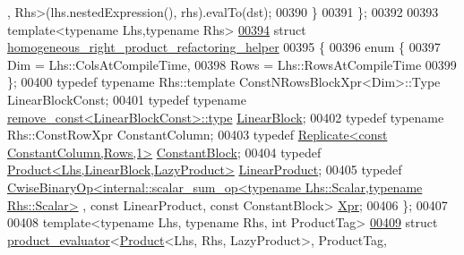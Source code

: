 \begin{DoxyCode}
      , Rhs>(lhs.nestedExpression(), rhs).evalTo(dst);
00390   \}
00391 \};
00392 
00393 \textcolor{keyword}{template}<\textcolor{keyword}{typename} Lhs,\textcolor{keyword}{typename} Rhs>
\hyperlink{struct_eigen_1_1internal_1_1homogeneous__right__product__refactoring__helper}{00394} \textcolor{keyword}{struct }\hyperlink{struct_eigen_1_1internal_1_1homogeneous__right__product__refactoring__helper}{homogeneous\_right\_product\_refactoring\_helper}
00395 \{
00396   \textcolor{keyword}{enum} \{
00397     Dim  = Lhs::ColsAtCompileTime,
00398     Rows = Lhs::RowsAtCompileTime
00399   \};
00400   \textcolor{keyword}{typedef} \textcolor{keyword}{typename} Rhs::template ConstNRowsBlockXpr<Dim>::Type          LinearBlockConst;
00401   \textcolor{keyword}{typedef} \textcolor{keyword}{typename} \hyperlink{group___sparse_core___module}{remove\_const<LinearBlockConst>::type}                
       \hyperlink{group___sparse_core___module}{LinearBlock};
00402   \textcolor{keyword}{typedef} \textcolor{keyword}{typename} Rhs::ConstRowXpr                                     ConstantColumn;
00403   \textcolor{keyword}{typedef} \hyperlink{group___core___module_class_eigen_1_1_replicate}{Replicate<const ConstantColumn,Rows,1>}                     
         \hyperlink{group___core___module_class_eigen_1_1_replicate}{ConstantBlock};
00404   \textcolor{keyword}{typedef} \hyperlink{group___core___module_class_eigen_1_1_product}{Product<Lhs,LinearBlock,LazyProduct>}                         
       \hyperlink{group___core___module_class_eigen_1_1_product}{LinearProduct};
00405   \textcolor{keyword}{typedef} 
      \hyperlink{group___core___module_class_eigen_1_1_cwise_binary_op}{CwiseBinaryOp<internal::scalar\_sum\_op<typename Lhs::Scalar,typename Rhs::Scalar>}
      , \textcolor{keyword}{const} LinearProduct, \textcolor{keyword}{const} ConstantBlock> \hyperlink{group___core___module_class_eigen_1_1_cwise_binary_op}{Xpr};
00406 \};
00407 
00408 \textcolor{keyword}{template}<\textcolor{keyword}{typename} Lhs, \textcolor{keyword}{typename} Rhs, \textcolor{keywordtype}{int} ProductTag>
\hyperlink{struct_eigen_1_1internal_1_1product__evaluator_3_01_product_3_01_lhs_00_01_rhs_00_01_lazy_produc94c394146b0a8c54b74b1b296d175015}{00409} \textcolor{keyword}{struct }\hyperlink{struct_eigen_1_1internal_1_1product__evaluator}{product\_evaluator}<\hyperlink{group___core___module_class_eigen_1_1_product}{Product}<Lhs, Rhs, LazyProduct>, ProductTag, 

\end{DoxyCode}

